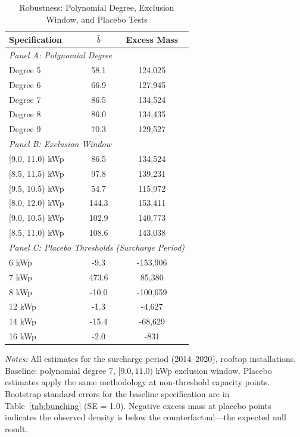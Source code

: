 \begin{table}[t]
\centering
\caption{Robustness: Polynomial Degree, Exclusion Window, and Placebo Tests}
\label{tab:robustness}
\begin{tabular}{lcc}
\toprule
Specification & $\hat{b}$ & Excess Mass \\
\midrule
\multicolumn{3}{l}{\textit{Panel A: Polynomial Degree}} \\
Degree 5 & 58.1 & 124,025 \\
Degree 6 & 66.9 & 127,945 \\
Degree 7 & 86.5 & 134,524 \\
Degree 8 & 86.0 & 134,435 \\
Degree 9 & 70.3 & 129,527 \\
\midrule
\multicolumn{3}{l}{\textit{Panel B: Exclusion Window}} \\
{}[9.0, 11.0) kWp & 86.5 & 134,524 \\
{}[8.5, 11.5) kWp & 97.8 & 139,231 \\
{}[9.5, 10.5) kWp & 54.7 & 115,972 \\
{}[8.0, 12.0) kWp & 144.3 & 153,411 \\
{}[9.0, 10.5) kWp & 102.9 & 140,773 \\
{}[8.5, 11.0) kWp & 108.6 & 143,038 \\
\midrule
\multicolumn{3}{l}{\textit{Panel C: Placebo Thresholds (Surcharge Period)}} \\
6 kWp & -9.3 & -153,906 \\
7 kWp & 473.6 & 85,380 \\
8 kWp & -10.0 & -100,659 \\
12 kWp & -1.3 & -4,627 \\
14 kWp & -15.4 & -68,629 \\
16 kWp & -2.0 & -831 \\
\bottomrule
\end{tabular}

\vspace{0.5em}
\begin{flushleft}\small \textit{Notes:} All estimates for the surcharge period (2014--2020), rooftop installations. Baseline: polynomial degree 7, $[9.0, 11.0)$ kWp exclusion window. Placebo estimates apply the same methodology at non-threshold capacity points. Bootstrap standard errors for the baseline specification are in Table~\ref{tab:bunching} (SE = 1.0). Negative excess mass at placebo points indicates the observed density is below the counterfactual---the expected null result.\end{flushleft}
\end{table}
